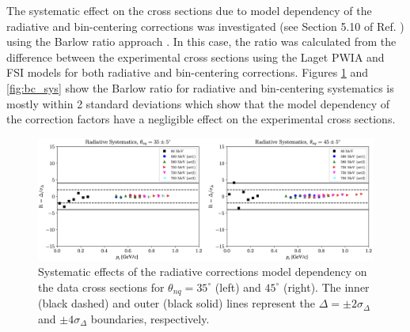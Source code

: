 \documentclass[aps, prl]{revtex4-2}  %
\begin{document}
\indent The systematic effect on the cross sections due to model dependency of the radiative and bin-centering corrections was investigated (see Section 5.10 of Ref. \cite{cyero_phdthesis})
using the Barlow ratio approach \cite{barlow2002systematic,barlow2017}. In this case, the ratio was calculated from the difference between the experimental cross
sections using the Laget PWIA and FSI models for both radiative and bin-centering corrections. Figures \ref{fig:rad_sys} and \ref{fig:bc_sys}
show the Barlow ratio for radiative and bin-centering systematics is mostly within 2 standard deviations which show that
the model dependency of the correction factors have a negligible effect on the experimental cross sections.
\begin{figure}[!h]
\includegraphics[scale=0.37]{plots/rad_sys.png}
\caption{Systematic effects of the radiative corrections model dependency on the data cross sections
  for $\theta_{nq}=35^{\circ}$ (left) and $45^{\circ}$ (right). The inner (black dashed) and outer (black solid)
  lines represent the $\Delta=\pm2\sigma_{\Delta}$ and $\pm4\sigma_{\Delta}$ boundaries, respectively.  }
\label{fig:rad_sys}
\end{figure}
\end{document}
